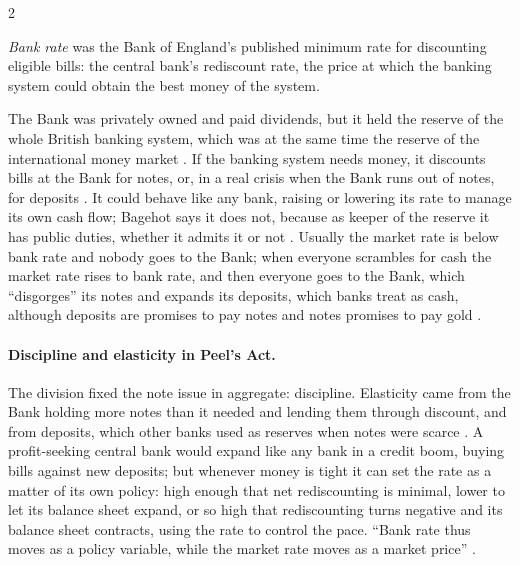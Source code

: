 \begin{paracol}{2}
\begin{definition}
\emph{Bank rate} was the Bank of England's published minimum rate for discounting eligible bills: the central bank's rediscount rate, the price at which the banking system could
obtain the best money of the system.
\end{definition}

The Bank was privately owned and paid dividends, but it held the reserve of the whole British banking system, which was at the same time the reserve of the international money
market . If the banking system needs money, it discounts bills at the Bank for notes, or, in a real crisis when the Bank runs out of notes, for deposits
. It could behave like any bank, raising or lowering its rate to manage its own cash flow; Bagehot says it does not, because as keeper of the reserve
it has public duties, whether it admits it or not . Usually the market rate is below bank rate and nobody goes to the Bank; when everyone scrambles
for cash the market rate rises to bank rate, and then everyone goes to the Bank, which ``disgorges'' its notes and expands its deposits, which banks treat as cash, although deposits
are promises to pay notes and notes promises to pay gold .

\paragraph{Discipline and elasticity in Peel's Act.} The division fixed the note issue in aggregate: discipline. Elasticity came from the Bank holding more notes than it needed and lending them
through discount, and from deposits, which other banks used as reserves when notes were scarce . A profit-seeking central bank would expand like any bank in a credit boom, buying
bills against new deposits; but whenever money is tight it can set the rate as a matter of its own policy: high enough that net rediscounting is minimal, lower to let its balance sheet expand,
or so high that rediscounting turns negative and its balance sheet contracts, using the rate to control the pace. ``Bank rate thus moves as a policy variable, while the market rate moves as a
market price'' .


\end{paracol}
